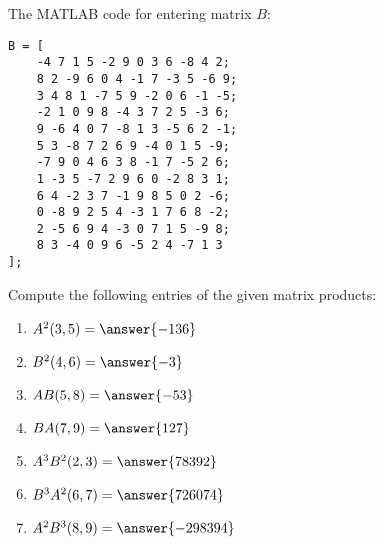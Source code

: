 \documentclass{ximera}
\begin{document}
\begin{exercise}
The MATLAB code for entering matrix $B$:
\begin{verbatim}
B = [  
    -4 7 1 5 -2 9 0 3 6 -8 4 2;  
    8 2 -9 6 0 4 -1 7 -3 5 -6 9;  
    3 4 8 1 -7 5 9 -2 0 6 -1 -5;  
    -2 1 0 9 8 -4 3 7 2 5 -3 6;  
    9 -6 4 0 7 -8 1 3 -5 6 2 -1;  
    5 3 -8 7 2 6 9 -4 0 1 5 -9;  
    -7 9 0 4 6 3 8 -1 7 -5 2 6;  
    1 -3 5 -7 2 9 6 0 -2 8 3 1;  
    6 4 -2 3 7 -1 9 8 5 0 2 -6;  
    0 -8 9 2 5 4 -3 1 7 6 8 -2;  
    2 -5 6 9 4 -3 0 7 1 5 -9 8;  
    8 3 -4 0 9 6 -5 2 4 -7 1 3  
];
\end{verbatim}


Compute the following entries of the given matrix products:

\begin{enumerate}
\item \( A^2(3,5) = \answer{-136}\)
\item \( B^2(4,6) = \answer{-3}\)
\item \( AB(5,8) = \answer{-53}\)
\item \( BA(7,9) = \answer{127}\)
\item \( A^3B^2(2,3) = \answer{78392}\)
\item \( B^3A^2(6,7) = \answer{726074}\)
\item \( A^2B^3(8,9) = \answer{-298394}\)
\end{enumerate}

\end{exercise}
\end{document}
